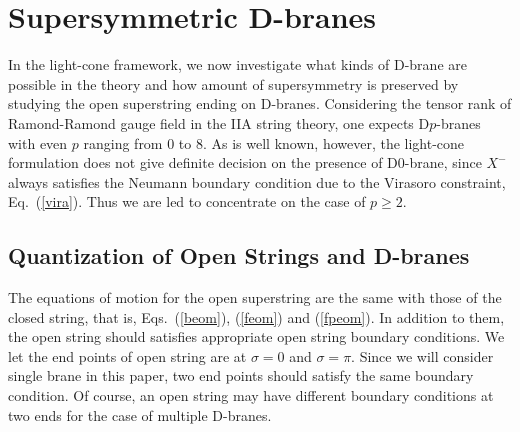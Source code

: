\documentclass[a4paper,12pt]{article}
\begin{document}
\section{Supersymmetric D-branes}

In the light-cone framework, we now investigate what kinds of D-brane
are possible in the theory and how amount of supersymmetry is
preserved by studying the open superstring ending on D-branes.
Considering the tensor rank of Ramond-Ramond gauge field in the IIA
string theory, one expects D$p$-branes with even $p$ ranging from 0 to
8.  As is well known, however, the light-cone formulation does not
give definite decision on the presence of D0-brane, since $X^-$ always
satisfies the Neumann boundary condition due to the Virasoro
constraint, Eq.~(\ref{vira}).  Thus we are led to concentrate on the
case of $p \ge 2$.


\subsection{Quantization of Open Strings and D-branes}

The equations of motion for the open superstring are the same with
those of the closed string, that is, Eqs.~(\ref{beom}), (\ref{feom})
and (\ref{fpeom}).  In addition to them, the open string should
satisfies appropriate open string boundary conditions.  We let the end
points of open string are at $\sigma = 0 $ and $\sigma = \pi$.  Since
we will consider single brane in this paper, two end points should
satisfy the same boundary condition.  Of course, an open string may
have different boundary conditions at two ends for the case of
multiple D-branes.
\end{document}
